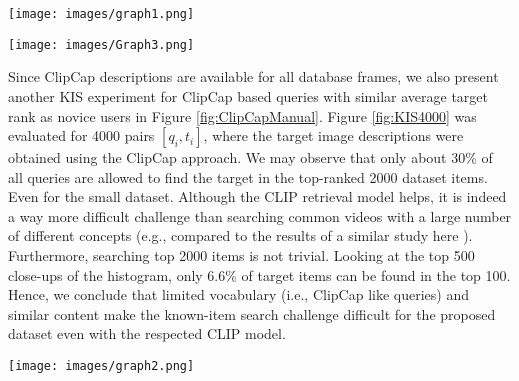 \documentclass[runningheads]{llncs}
\begin{document}
\begin{figure*}
\begin{center}
    \centering
\texttt{[image: images/graph1.png]}
\end{center}
  \caption{Occurrence of words in frame captions. Computed for a subset of the dataset.}
\label{fig:Words}
\end{figure*}

\begin{figure*}
\begin{center}
\centering
\texttt{[image: images/Graph3.png]}
\end{center}
  \caption{Ranks for ClipCap, Novice, and VBS Expert text queries for 100 target images. }
\label{fig:ClipCapManual}
\end{figure*}

Since ClipCap descriptions are available for all database frames, we also present another KIS experiment for ClipCap based queries with similar average target rank as novice users in Figure \ref{fig:ClipCapManual}.
Figure \ref{fig:KIS4000} was evaluated for 4000 pairs $[q_i, t_i]$, where the target image descriptions were obtained using the ClipCap approach. We may observe that only about 30\% of all queries are allowed to find the target in the top-ranked 2000 dataset items. Even for the small dataset. Although the CLIP retrieval model helps, it is indeed a way more difficult challenge than searching common videos with a large number of different concepts (e.g., compared to the results of a similar study here \cite{LokocS21}). Furthermore, searching top 2000 items is not trivial. Looking at the top 500 close-ups of the histogram, only 6.6\% of target items can be found in the top 100. Hence, we conclude that limited vocabulary (i.e., ClipCap like queries) and similar content make the known-item search challenge difficult for the proposed dataset even with the respected CLIP model.

\begin{figure*}
\begin{center}
    \centering
\texttt{[image: images/graph2.png]}
\end{center}
  \caption{4000 KIS queries using ClipCap captions, histogram bins aggregate ranks of target images for the corresponding queries.}
\label{fig:KIS4000}
\end{figure*}
\end{document}
